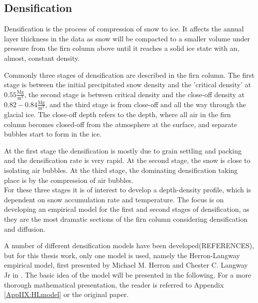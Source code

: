 \documentclass[../../CompleteThesis2/Complete_2ndDraft]{subfiles}
\begin{document}
\subsection[Densification][Densification]{Densification}
\label{Subsec:Ice_DiffusionAndDensification_Densification}
Densification is the process of compression of snow to ice. It affects the annual layer thickness in the data as snow will be compacted to a smaller volume under pressure from the firn column above until it reaches a solid ice state with an, almost, constant density.

Commonly three stages of densification are described in the firn column. The first stage is between the initial precipitated snow density and the 'critical density' at $0.55 \frac{\text{Mg}}{\text{m}^3}$, the second stage is between critical density and the close-off density at $0.82-0.84 \frac{\text{Mg}}{\text{m}^3}$, and the third stage is from close-off and all the way through the glacial ice. The close-off depth refers to the depth, where all air in the firn column becomes closed-off from the atmosphere at the surface, and separate bubbles start to form in the ice.

At the first stage the densification is mostly due to grain settling and packing and the densification rate is very rapid. At the second stage, the snow is close to isolating air bubbles. At the third stage, the dominating densification taking place is by the compression of air bubbles.\\
For these three stages it is of interest to develop a depth-density profile, which is dependent on snow accumulation rate and temperature. The focus is on developing an empirical model for the first and second stages of densification, as they are the most dramatic sections of the firn column considering densification and diffusion.

A number of different densification models have been developed(REFERENCES),  but for this thesis work, only one model is used, namely the Herron-Langway empirical model, first presented by Michael M. Herron and Chester C. Langway Jr in \cite[Herron and Langway, 1980]{HerronLangway1980}. The basic idea of the model will be presented in the following. For a more thorough mathematical presentation, the reader is referred to Appendix \ref{AppIIX:HLmodel} or the original paper.
\end{document}
